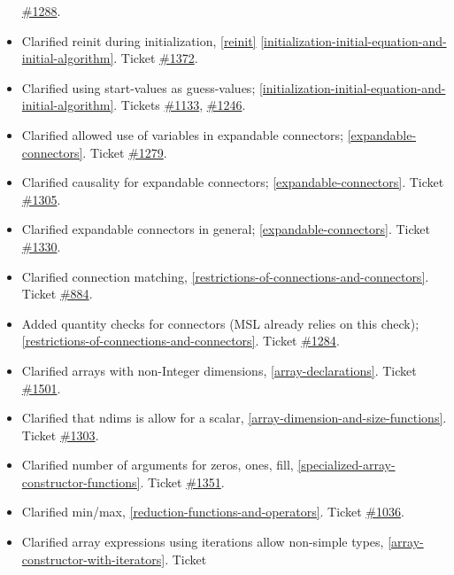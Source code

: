 \begin{itemize}
  \href{https://trac.modelica.org/Modelica/ticket/1288}{\#1288}.
\item
  Clarified reinit during initialization, \autoref{reinit} \autoref{initialization-initial-equation-and-initial-algorithm}. Ticket
  \href{https://trac.modelica.org/Modelica/ticket/1372}{\#1372}.
\item
  Clarified using start-values as guess-values; \autoref{initialization-initial-equation-and-initial-algorithm}. Tickets
  \href{https://trac.modelica.org/Modelica/ticket/1133}{\#1133},
  \href{https://trac.modelica.org/Modelica/ticket/1246}{\#1246}.
\item
  Clarified allowed use of variables in expandable connectors; \autoref{expandable-connectors}. Ticket
  \href{https://trac.modelica.org/Modelica/ticket/1279}{\#1279}.
\item
  Clarified causality for expandable connectors; \autoref{expandable-connectors}. Ticket
  \href{https://trac.modelica.org/Modelica/ticket/1305}{\#1305}.
\item
  Clarified expandable connectors in general; \autoref{expandable-connectors}. Ticket
  \href{https://trac.modelica.org/Modelica/ticket/1330}{\#1330}.
\item
  Clarified connection matching, \autoref{restrictions-of-connections-and-connectors}. Ticket
  \href{https://trac.modelica.org/Modelica/ticket/884}{\#884}.
\item
  Added quantity checks for connectors (MSL already relies on this
  check); \autoref{restrictions-of-connections-and-connectors}. Ticket
  \href{https://trac.modelica.org/Modelica/ticket/1284}{\#1284}.
\item
  Clarified arrays with non-Integer dimensions, \autoref{array-declarations}. Ticket
  \href{https://trac.modelica.org/Modelica/ticket/1501}{\#1501}.
\item
  Clarified that ndims is allow for a scalar, \autoref{array-dimension-and-size-functions}. Ticket
  \href{https://trac.modelica.org/Modelica/ticket/1303}{\#1303}.
\item
  Clarified number of arguments for zeros, ones, fill, \autoref{specialized-array-constructor-functions}.
  Ticket \href{https://trac.modelica.org/Modelica/ticket/1351}{\#1351}.
\item
  Clarified min/max, \autoref{reduction-functions-and-operators}. Ticket
  \href{https://trac.modelica.org/Modelica/ticket/1036}{\#1036}.
\item
  Clarified array expressions using iterations allow non-simple types,
  \autoref{array-constructor-with-iterators}. Ticket

\end{itemize}
